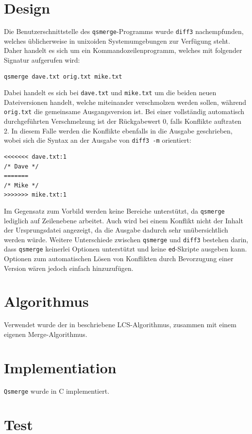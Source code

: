 \documentclass[a4paper,titlepage,12pt]{scrartcl}
\begin{document}
\section{Design}
\label{sec:design}
Die Benutzerschnittstelle des \texttt{qsmerge}-Programms wurde \texttt{diff3} nachempfunden,
welches üblicherweise in unixoiden Systemumgebungen zur Verfügung steht.
Daher handelt es sich um ein Kommandozeilenprogramm,
welches mit folgender Signatur aufgerufen wird:
\lstset{language=sh, numbers=none, xleftmargin=0pt}
\begin{lstlisting}
qsmerge dave.txt orig.txt mike.txt
\end{lstlisting}
Dabei handelt es sich bei \texttt{dave.txt} und \texttt{mike.txt} um die beiden neuen Dateiversionen handelt,
welche miteinander verschmolzen werden sollen,
während \texttt{orig.txt} die gemeinsame Ausgangsversion ist.
Bei einer vollständig automatisch durchgeführten Verschmelzung ist der Rückgabewert 0,
falls Konflikte auftraten 2.
In diesem Falle werden die Konflikte ebenfalls in die Ausgabe geschrieben,
wobei sich die Syntax an der Ausgabe von \texttt{diff3 -m} orientiert:
\begin{verbatim}
<<<<<<< dave.txt:1
/* Dave */
=======
/* Mike */
>>>>>>> mike.txt:1
\end{verbatim}
Im Gegensatz zum Vorbild werden keine Bereiche unterstützt,
da \texttt{qsmerge} lediglich auf Zeilenebene arbeitet.
Auch wird bei einem Konflikt nicht der Inhalt der Ursprungsdatei angezeigt,
da die Ausgabe dadurch sehr unübersichtlich werden würde.
Weitere Unterschiede zwischen \texttt{qsmerge} und \texttt{diff3} bestehen darin,
dass \texttt{qsmerge} keinerlei Optionen unterstützt und keine \texttt{ed}-Skripte ausgeben kann.
\\
Optionen zum automatischen Lösen von Konflikten durch Bevorzugung einer Version wären jedoch einfach hinzuzufügen.

\section{Algorithmus}
\label{sec:algorithm}
Verwendet wurde der in \citet{web:eppstein} beschriebene LCS-Algorithmus,
zusammen mit einem eigenen Merge-Algorithmus.

\section{Implementiation}
\label{sec:implementation}
\texttt{Qsmerge} wurde in C implementiert.

\section{Test}
\label{sec:test}



\end{document}
